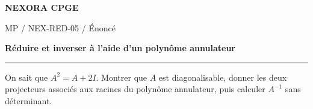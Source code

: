 \documentclass[11pt,a4paper]{article}
\begin{document}
{\small\bfseries\color{nexorablue} NEXORA CPGE}\par
{\small MP / NEX-RED-05 / Énoncé}\par
{\LARGE\bfseries Réduire et inverser à l’aide d’un polynôme annulateur}\par
\vspace{0.25em}\hrule\vspace{0.6em}

On sait que $A^2=A+2I$. Montrer que $A$ est diagonalisable, donner les deux projecteurs associés aux racines du polynôme annulateur, puis calculer $A^{-1}$ sans déterminant.
\end{document}

